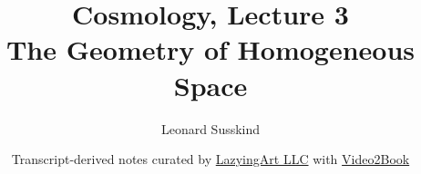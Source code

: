 \documentclass[11pt,oneside]{book}
\begin{document}
\hypersetup{pageanchor=false}
\frontmatter
\title{Cosmology, Lecture 3\\The Geometry of Homogeneous Space}
\author{Leonard Susskind}
\date{Transcript-derived notes curated by \href{https://lazying.art}{LazyingArt LLC} with \href{https://github.com/lachlanchen/Video2Book}{Video2Book}}
\maketitle
\hypersetup{pageanchor=true}
\mainmatter

\end{document}
